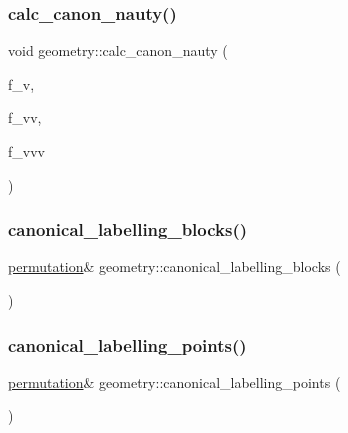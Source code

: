 \subsubsection{\texorpdfstring{calc\+\_\+canon\+\_\+nauty()}{calc\_canon\_nauty()}}
{\footnotesize\ttfamily void geometry\+::calc\+\_\+canon\+\_\+nauty (\begin{DoxyParamCaption}\item[{\mbox{\hyperlink{galois_8h_a09fddde158a3a20bd2dcadb609de11dc}{I\+NT}}}]{f\+\_\+v,  }\item[{\mbox{\hyperlink{galois_8h_a09fddde158a3a20bd2dcadb609de11dc}{I\+NT}}}]{f\+\_\+vv,  }\item[{\mbox{\hyperlink{galois_8h_a09fddde158a3a20bd2dcadb609de11dc}{I\+NT}}}]{f\+\_\+vvv }\end{DoxyParamCaption})}

\mbox{\label{classgeometry_a6d9453619be9ea76e6e63485594b301f}} 
\subsubsection{\texorpdfstring{canonical\+\_\+labelling\+\_\+blocks()}{canonical\_labelling\_blocks()}}
{\footnotesize\ttfamily \mbox{\hyperlink{classpermutation}{permutation}}\& geometry\+::canonical\+\_\+labelling\+\_\+blocks (\begin{DoxyParamCaption}{ }\end{DoxyParamCaption})\hspace{0.3cm}{\ttfamily [inline]}}

\mbox{\label{classgeometry_ac426783bf96ded3a50f6746f521bdd31}} 
\subsubsection{\texorpdfstring{canonical\+\_\+labelling\+\_\+points()}{canonical\_labelling\_points()}}
{\footnotesize\ttfamily \mbox{\hyperlink{classpermutation}{permutation}}\& geometry\+::canonical\+\_\+labelling\+\_\+points (\begin{DoxyParamCaption}{ }\end{DoxyParamCaption})\hspace{0.3cm}{\ttfamily [inline]}}


